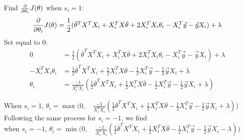 \documentclass[11pt]{article}
\begin{document}
Find $\frac{\partial}{\partial\theta_i} J(\theta)$ when $s_i = 1$:
\begin{align*}
\frac{\partial}{\partial\theta_i} J(\theta) = \frac{1}{2} ( \bar{\theta}^T X^T X_i + X_i^T X \bar{\theta} + 2 X_i^T X_i \theta_i - X_i^T \vec{y} - \vec{y} X_i) + \lambda \\
\end{align*}
Set equal to 0:
\begin{align*}
                       0 &= \frac{1}{2} ( \bar{\theta}^T X^T X_i + X_i^T X \bar{\theta} + 2 X_i^T X_i \theta_i - X_i^T \vec{y} - \vec{y} X_i) + \lambda \\
    - X_i^T X_i \theta_i &= \frac{1}{2} \bar{\theta}^T X^T X_i + \frac{1}{2} X_i^T X \bar{\theta} - \frac{1}{2} X_i^T \vec{y} - \frac{1}{2} \vec{y} X_i + \lambda \\
                \theta_i &= \frac{-1}{X_i^T X_i} (\frac{1}{2} \bar{\theta}^T X^T X_i + \frac{1}{2} X_i^T X \bar{\theta} - \frac{1}{2} X_i^T \vec{y} - \frac{1}{2} \vec{y} X_i + \lambda)
\end{align*}

When $s_i = 1$, $\theta_i = \max\bigg(0,\quad \frac{-1}{X_i^T X_i} (\frac{1}{2} \bar{\theta}^T X^T X_i + \frac{1}{2} X_i^T X \bar{\theta} - \frac{1}{2} X_i^T \vec{y} - \frac{1}{2} \vec{y} X_i + \lambda)\bigg)$ \\

Following the same process for $s_i = -1$, we find \\

when $s_i = -1$, $\theta_i = \min\bigg(0, \quad \frac{-1}{X_i^T X_i} (\frac{1}{2} \bar{\theta}^T X^T X_i + \frac{1}{2} X_i^T X \bar{\theta} - \frac{1}{2} X_i^T \vec{y} - \frac{1}{2} \vec{y} X_i - \lambda) \bigg)$ \\
\end{document}
